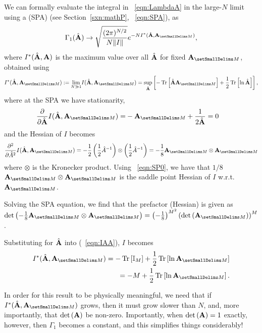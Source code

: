 We can formally evaluate the integral in \EQN~\ref{eqn:LambdaA} in the large-$N$ limit using a \SaddlePointApproximation (SPA)
(see Section~\ref{sxn:mathP}, \EQN~\ref{eqn:SPA}), as
\begin{align}
\label{eqn:LAMBDA}
\Gamma_1(\AHAT)\rightarrow \sqrt{\dfrac{(2\pi)^{N/2}}{N\Vert I\Vert}}e^{-N I^{*}(\AHAT, \AMATM)}  ,
\end{align}
where $I^{*}(\hat{\mathbf{A}},\mathbf{A})$ is the maximum value over all $\hat{\mathbf{A}}$ for fixed $\AMATM$, obtained using
\begin{align}
  \label{eqn:IAA-sup}
  I^{*}(\AHAT,\AMATM) :=
\underset{N\gg 1}{\lim} I(\AHAT,\AMATM) =
 \underset{\AHAT}{\sup}\left[-\Trace{\AHAT\AMATM}+\frac{1}{2}\Trace{\ln\AHAT}\right]  ,
\end{align}
where at the SPA we have stationarity,
\begin{align}
  \label{eqn:SP0}
  \dfrac{\partial}{\partial\AHAT}I(\AHAT,\AMATM) =& -\AMATM+\dfrac{1}{2\AHAT}=0  
\end{align}
and the Hessian of $I$ becomes
\begin{align}
  \label{eqn:Ixx}
\frac{\partial^2 }{\partial \hat{A}^2} I(\AHAT,\AMATM)= -\frac{1}{2} \left( \frac{1}{2} \hat{A}^{-1} \right) \otimes \left( \frac{1}{2} \hat{A}^{-1} \right) = -\frac{1}{8} \AMATM \otimes \AMATM
\end{align}
where $\otimes$ is the Kronecker product. Using \EQN~\ref{eqn:SP0}, we have that $1 / 8$ $\AMATM \otimes \AMATM$ is the saddle point Hessian of $I$ w.r.t. $\AMATM$.

Solving the SPA equation, we find that %
the prefactor (Hessian) is given as
$ \Det{-\frac{1}{8} \AMATM \otimes \AMATM} = \left( -\frac{1}{8} \right)^{M^2} \left(  \Det{\AMATM} \right)^M$.



Substituting for $\hat{\mathbf{A}}$ into \RateFunction (\EQN~\ref{eqn:IAA}), $I$ becomes
\begin{align}
\label{eqn:IAA_2}
I^{*}(\AHAT,\AMATM) = -\Trace{ \mathbb{I}_{M} } + \frac{1}{2}\Trace{ \ln\AMATM }   \\ \nonumber
 = -M + \frac{1}{2}\Trace{ \ln\AMATM }  .
\end{align}

\noindent
In order for this result to be physically meaningful, 
we need that if $I^{*}(\AHAT,\AMATM)$ grows,
then it must grow slower than $N$, and,
more importantly, that $\mbox{}{\text{det}}\left(\mathbf{A}\right)$ be non-zero.
Importantly, when $\mbox{}{\text{det}}\left(\mathbf{A}\right)=1$ exactly, however, then $\Gamma_1$ becomes a constant,
and this simplifies things considerably!

